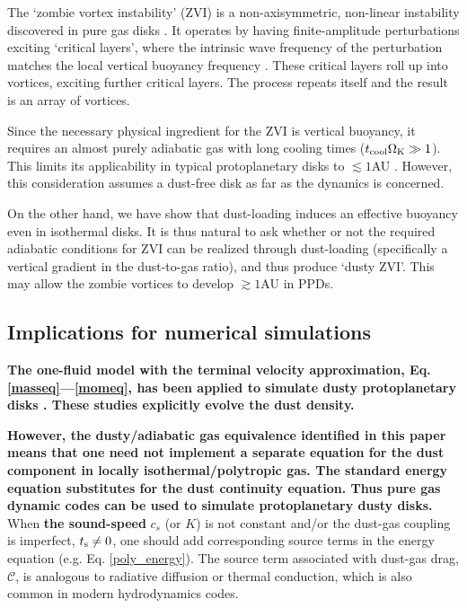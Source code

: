 The `zombie vortex instability' (ZVI) is a non-axisymmetric,
non-linear instability discovered in pure gas disks
\citep{marcus15,umurhan16d}. It operates by having finite-amplitude perturbations
exciting `critical layers',  where the intrinsic wave frequency of the
perturbation matches the local vertical buoyancy frequency 
\citep{marcus13}. These critical layers roll 
up into vortices, exciting further critical layers. The process
repeats itself and the result is an array of vortices. 

Since the necessary physical ingredient for the ZVI is vertical
buoyancy, it requires an almost purely adiabatic gas with long cooling times ($t_\mathrm{cool}\Omega_{\rm K}\gg
1$). This limits its applicability in typical protoplanetary disks to 
$\lesssim 1$AU \citep{lesur16, malygin17}. However, this consideration
assumes a dust-free disk as far as the dynamics is concerned. 

On the other hand, we have show that dust-loading induces an effective
buoyancy even in isothermal disks. It is thus natural to ask whether or not
the required adiabatic conditions for ZVI can be realized through
dust-loading (specifically a vertical gradient in the dust-to-gas ratio), 
and thus produce `dusty ZVI'. This may allow the zombie 
vortices to develop $\gtrsim 1$AU in PPDs. 

\subsection{Implications for numerical simulations}\label{dust_sims}
{\bf The one-fluid model with the terminal velocity approximation, Eq. \ref{masseq}---\ref{momeq}, 
has been applied to simulate dusty protoplanetary disks \citep{dipierro15,ragusa17}. These studies 
explicitly evolve the dust density.  
}

{\bf However, the dusty/adiabatic gas equivalence identified in this paper
means that one need not implement a separate equation for the dust component in
locally isothermal/polytropic gas. The standard energy equation substitutes for the dust continuity 
equation. Thus pure gas dynamic codes can be used to simulate protoplanetary dusty disks. 
} %
When {\bf the sound-speed} $c_s$ (or $K$) is not constant and/or the dust-gas coupling is imperfect, $t_\mathrm{s}\neq0$, one
should add corresponding source terms in the energy equation
(e.g. Eq. \ref{poly_energy}). 
The source term associated with dust-gas drag, $\mathcal{C}$, is 
analogous to radiative diffusion \citep{price15} or thermal 
conduction, which is also common in modern hydrodynamics codes.       

